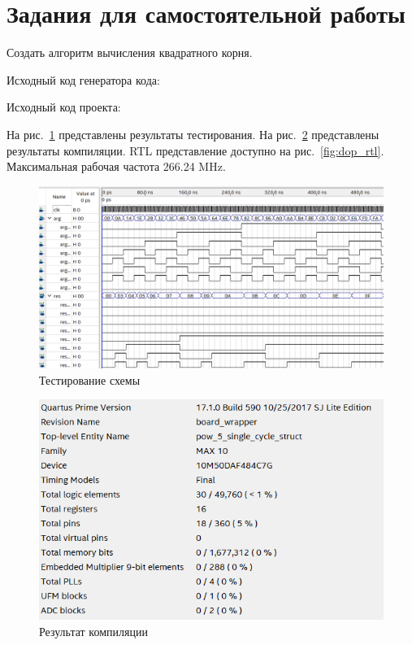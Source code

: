 \documentclass[a4paper,14pt]{article}
\begin{document}
	\section{Задания для самостоятельной работы}
	
	Создать алгоритм вычисления квадратного корня.
	
	Исходный код генератора кода:
	{\small {}}
	
	Исходный код проекта:
	{\small {}}
	
	На рис.~\ref{fig:dop_wave} представлены результаты тестирования.
	На рис.~\ref{fig:dop_report} представлены результаты компиляции.
	RTL представление доступно на рис.~\ref{fig:dop_rtl}.
	Максимальная рабочая частота 266.24 MHz.
	
	\begin{figure}[H]
		\centering
		\includegraphics[width=0.8\linewidth]{images/dop_wave}
		\caption{Тестирование схемы}
		\label{fig:dop_wave}
	\end{figure}

	\begin{figure}[H]
		\centering
		\includegraphics[width=0.8\linewidth]{images/dop_report}
		\caption{Результат компиляции}
		\label{fig:dop_report}
	\end{figure}
	
\end{document}
